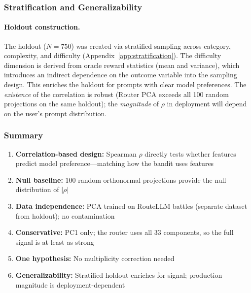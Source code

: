 \subsubsection{Stratification and Generalizability}

\paragraph{Holdout construction.}
The holdout ($N=750$) was created via stratified sampling across category, complexity, and difficulty (Appendix~\ref{app:stratification}).
The difficulty dimension is derived from oracle reward statistics (mean and variance), which introduces an indirect dependence on the outcome variable into the sampling design.
This enriches the holdout for prompts with clear model preferences.
The \emph{existence} of the correlation is robust (Router PCA exceeds all 100 random projections on the same holdout); the \emph{magnitude} of $\rho$ in deployment will depend on the user's prompt distribution.

\subsubsection{Summary}

\begin{enumerate}[leftmargin=*,noitemsep,topsep=0pt]
    \item \textbf{Correlation-based design:} Spearman $\rho$ directly tests whether features predict model preference---matching how the bandit uses features
    \item \textbf{Null baseline:} 100 random orthonormal projections provide the null distribution of $|\rho|$
    \item \textbf{Data independence:} PCA trained on RouteLLM battles (separate dataset from holdout); no contamination
    \item \textbf{Conservative:} PC1 only; the router uses all 33 components, so the full signal is at least as strong
    \item \textbf{One hypothesis:} No multiplicity correction needed
    \item \textbf{Generalizability:} Stratified holdout enriches for signal; production magnitude is deployment-dependent
\end{enumerate}

